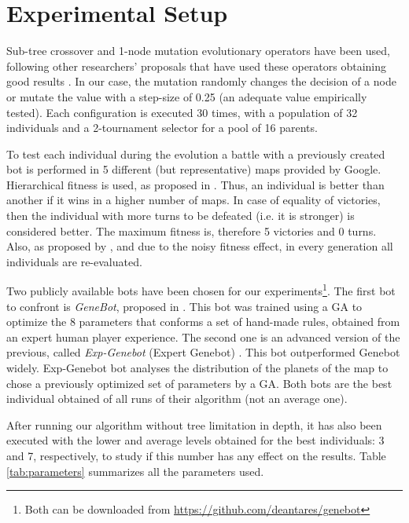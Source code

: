 \section{Experimental Setup}
\label{sec:experiments}

Sub-tree crossover and 1-node mutation evolutionary operators have been used, following other researchers' proposals that have used these operators obtaining good results \cite{Esparcia2013GPunreal}. In our case, the mutation randomly changes the decision of a node or mutate the value with a step-size of 0.25 (an adequate value empirically tested). Each configuration is executed 30 times, with a population of 32 individuals and a 2-tournament selector for a pool of 16 parents.

To test each individual during the evolution a battle with a previously created bot is performed in 5 different (but representative) maps provided by Google. Hierarchical fitness is used, as proposed in \cite{Mora2012Genebot}. Thus, an individual is better than another if it wins in a higher number of maps. In case of equality of victories, then the individual with more turns to be defeated (i.e. it is stronger) is considered better. The maximum fitness is, therefore 5 victories and 0 turns. Also, as proposed by \cite{Mora2012Genebot}, and due to the noisy fitness effect, in every generation all individuals are re-evaluated.


Two publicly available bots have been chosen for our experiments\footnote{Both can be downloaded from \url{https://github.com/deantares/genebot}}. The first bot to confront is {\em GeneBot}, proposed in \cite{Mora2012Genebot}. This bot was trained using a GA to optimize the 8 parameters that conforms a set of hand-made rules, obtained from an expert human player experience. The second one is an advanced version of the previous, called {\em Exp-Genebot} (Expert Genebot) \cite{FernandezAres2012adaptive}. This bot outperformed Genebot widely. Exp-Genebot bot analyses the distribution of the planets of the map to chose a previously optimized set of parameters by a GA.  Both bots are the best individual obtained of all runs of their algorithm (not an average one).

After running our algorithm without tree limitation in depth, it has also been executed with the lower and average levels obtained for the best individuals: 3 and 7, respectively, to study if this number has any effect on the results.   Table \ref{tab:parameters} summarizes all the parameters used.

